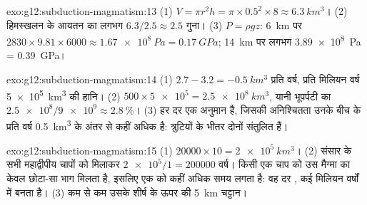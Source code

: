 \begin{solution}{exo:g12:subduction-magmatism:13}
(1) $V = \pi r^2 h = \pi \times 0.5^2 \times 8 \approx \qty{6.3}{km^3}$।
(2) हिमस्खलन के आयतन का लगभग $6.3/2.5 \approx 2.5$ गुना।
(3) $P = \rho g z$: \qty{6}{km} पर $2830 \times 9.81 \times 6000 \approx
\qty{1.67e8}{Pa} = \qty{0.17}{GPa}$; \qty{14}{km} पर लगभग
\qty{3.89e8}{Pa} = \qty{0.39}{GPa}।
\end{solution}

\begin{solution}{exo:g12:subduction-magmatism:14}
(1) $2.7 - 3.2 = \qty{-0.5}{km^3}$ प्रति वर्ष, प्रति मिलियन वर्ष \qty{5e5}{km^3}
की हानि। (2) $500 \times \num{5e5} = \qty{2.5e8}{km^3}$, यानी
भूपर्पटी का $\num{2.5e8}/\num{9e9} \approx \qty{2.8}{\percent}$। (3) हर
दर एक अनुमान है, जिसकी अनिश्चितता उनके बीच के प्रति वर्ष \qty{0.5}{km^3} के
अंतर से कहीं अधिक है: त्रुटियों के भीतर दोनों संतुलित हैं।
\end{solution}

\begin{solution}{exo:g12:subduction-magmatism:15}
(1) $\num{20000} \times 10 = \qty{2e5}{km^3}$। (2) संसार के सभी महाद्वीपीय चापों को मिलाकर $\num{2e5}/1 =
\num{200000}$ वर्ष। किसी एक
चाप को उस मैग्मा का केवल छोटा-सा भाग मिलता है, इसलिए एक  को
कहीं अधिक समय लगता है: वह  दर , कई मिलियन वर्षों में बनता है। (3) कम से
कम उसके शीर्ष के ऊपर की \qty{5}{km} चट्टान।
\end{solution}

